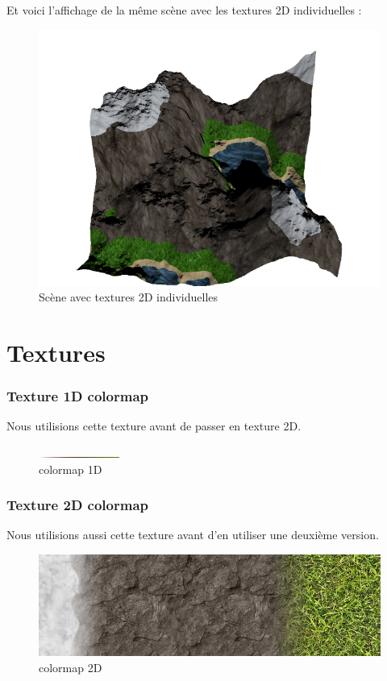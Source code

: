 \documentclass{article}
\begin{document}
Et voici l'affichage de la même scène avec les textures 2D individuelles :

\begin{figure}[h]
	\center
	\includegraphics[scale=0.30]{screen10.png}
	\caption{Scène avec textures 2D individuelles}
\end{figure}

\section{Textures}

\subsubsection{Texture 1D colormap}
Nous utilisions cette texture avant de passer en texture 2D.

\begin{figure}[h]
	\center
	\includegraphics[scale=12.0]{../textures/1DcolorTex.png}
	\caption{colormap 1D}
\end{figure}
\newpage
\subsubsection{Texture 2D colormap}
Nous utilisions aussi cette texture avant d'en utiliser une deuxième version.

\begin{figure}[h]
	\center
	\includegraphics[scale=0.30]{../textures/2DcolorTex.png}
	\caption{colormap 2D}
\end{figure}
\end{document}
